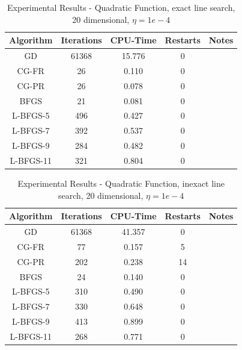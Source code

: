 \documentclass[12pt]{amsart}
\begin{document}
\begin{table}
\caption{Experimental Results - Quadratic Function, exact line search, 20 dimensional, $\eta=1e-4$}
\label{table_exact_quad}
\begin{center}
\begin{tabular}{|c||c||c||c||c|}
\hline
Algorithm & Iterations & CPU-Time & Restarts & Notes\\
\hline
GD & 61368 & 15.776 & 0 & \\
\hline
CG-FR & 26 & 0.110 & 0 & \\
\hline
CG-PR & 26 & 0.078 & 0 & \\
\hline
BFGS & 21 & 0.081& 0 & \\
\hline
L-BFGS-5 & 496 & 0.427 & 0 &\\
\hline
L-BFGS-7 & 392 & 0.537 & 0 &\\
\hline
L-BFGS-9 & 284 & 0.482 & 0 &\\
\hline
L-BFGS-11 & 321 & 0.804 & 0 &\\
\hline
\end{tabular}
\end{center}
\end{table}


\begin{table}
\caption{Experimental Results - Quadratic Function, inexact line search, 20 dimensional, $\eta=1e-4$}
\label{table_inexact_quad}
\begin{center}
\begin{tabular}{|c||c||c||c||c|}
\hline
Algorithm & Iterations & CPU-Time & Restarts & Notes\\
\hline
GD & 61368 & 41.357 & 0 & \\
\hline
CG-FR & 77 & 0.157 & 5 & \\
\hline
CG-PR & 202 & 0.238 & 14 & \\
\hline
BFGS & 24 & 0.140& 0 & \\
\hline
L-BFGS-5 & 310 & 0.490 & 0 &\\
\hline
L-BFGS-7 & 330 & 0.648 & 0 &\\
\hline
L-BFGS-9 & 413 & 0.899 & 0 &\\
\hline
L-BFGS-11 & 268 & 0.771& 0 &\\
\hline
\end{tabular}
\end{center}
\end{table}
\end{document}

